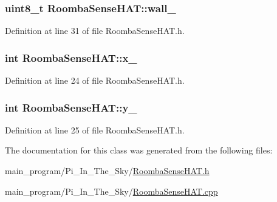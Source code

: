 \subsubsection[{\texorpdfstring{wall\+\_\+}{wall_}}]{\setlength{\rightskip}{0pt plus 5cm}uint8\+\_\+t Roomba\+Sense\+H\+A\+T\+::wall\+\_\+\hspace{0.3cm}{\ttfamily [protected]}}\hypertarget{class_roomba_sense_h_a_t_a51d95cef9e8394e0d2a8585daf83fc16}{}\label{class_roomba_sense_h_a_t_a51d95cef9e8394e0d2a8585daf83fc16}


Definition at line 31 of file Roomba\+Sense\+H\+A\+T.\+h.

\subsubsection[{\texorpdfstring{x\+\_\+}{x_}}]{\setlength{\rightskip}{0pt plus 5cm}int Roomba\+Sense\+H\+A\+T\+::x\+\_\+\hspace{0.3cm}{\ttfamily [protected]}}\hypertarget{class_roomba_sense_h_a_t_a582d0e9fad099c1f7e0ba6a22567676e}{}\label{class_roomba_sense_h_a_t_a582d0e9fad099c1f7e0ba6a22567676e}


Definition at line 24 of file Roomba\+Sense\+H\+A\+T.\+h.

\subsubsection[{\texorpdfstring{y\+\_\+}{y_}}]{\setlength{\rightskip}{0pt plus 5cm}int Roomba\+Sense\+H\+A\+T\+::y\+\_\+\hspace{0.3cm}{\ttfamily [protected]}}\hypertarget{class_roomba_sense_h_a_t_a3732a5d17f708fd18959beb0a4123d25}{}\label{class_roomba_sense_h_a_t_a3732a5d17f708fd18959beb0a4123d25}


Definition at line 25 of file Roomba\+Sense\+H\+A\+T.\+h.



The documentation for this class was generated from the following files\+:\begin{DoxyCompactItemize}
\item 
main\+\_\+program/\+Pi\+\_\+\+In\+\_\+\+The\+\_\+\+Sky/\hyperlink{_roomba_sense_h_a_t_8h}{Roomba\+Sense\+H\+A\+T.\+h}\item 
main\+\_\+program/\+Pi\+\_\+\+In\+\_\+\+The\+\_\+\+Sky/\hyperlink{_roomba_sense_h_a_t_8cpp}{Roomba\+Sense\+H\+A\+T.\+cpp}\end{DoxyCompactItemize}

